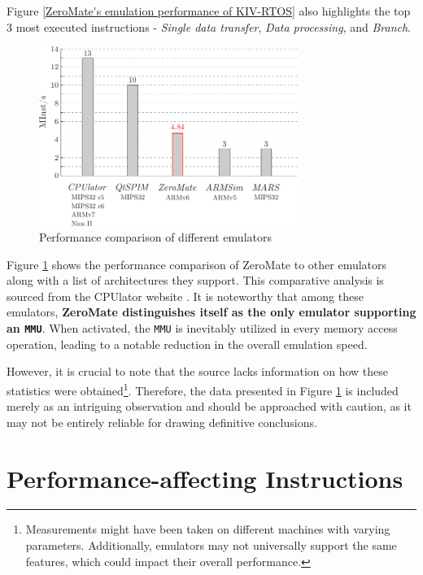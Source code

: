 \documentclass[english, ing, kiv, he, iso690numb, pdf]{fasthesis}
\begin{document}
	Figure \ref{ZeroMate's emulation performance of KIV-RTOS} also highlights the top 3 most executed instructions - \textit{Single data transfer}, \textit{Data processing}, and \textit{Branch}.
	
	\begin{figure}[ht]
		\centering
		\includegraphics[width=0.75\textwidth]{img/diagrams/performance_comparison.pdf}
		\caption{Performance comparison of different emulators}
		\label{Performance comparison of different emulators}
	\end{figure}
	
	Figure \ref{Performance comparison of different emulators} shows the performance comparison of ZeroMate to other emulators along with a list of architectures they support. This comparative analysis is sourced from the CPUlator website \cite{CPUlator}. It is noteworthy that among these emulators, \textbf{ZeroMate distinguishes itself as the only emulator supporting an \texttt{MMU}}. When activated, the \texttt{MMU} is inevitably utilized in every memory access operation, leading to a notable reduction in the overall emulation speed.
	
	\begin{important}
		However, it is crucial to note that the source lacks information on how these statistics were obtained\footnote{Measurements might have been taken on different machines with varying parameters. Additionally, emulators may not universally support the same features, which could impact their overall performance.}. Therefore, the data presented in Figure \ref{Performance comparison of different emulators} is included merely as an intriguing observation and should be approached with caution, as it may not be entirely reliable for drawing definitive conclusions.
	\end{important}
	
	\section{Performance-affecting Instructions}
	
\end{document}
